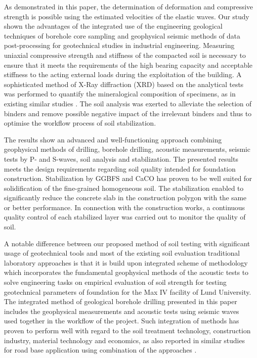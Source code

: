 \documentclass[USenglish,twocolumn]{article}
\begin{document}
As demonstrated in this paper, the determination of deformation and compressive strength is possible using the estimated velocities of the elastic waves. Our study shown the advantages of the integrated use of the engineering geological techniques of borehole core sampling and geophysical seismic methods of data post-processing for geotechnical studies in industrial engineering. Measuring uniaxial compressive strength and stiffness of the compacted soil is necessary to ensure that it meets the requirements of the high bearing capacity and acceptable stiffness to the acting external loads during the exploitation of the building. A sophisticated method of X-Ray diffraction (XRD) based on the analytical tests was performed to quantify the mineralogical composition of specimens, as in existing similar studies \cite{Pires,Naik}. The soil analysis was exerted to alleviate the selection of binders and remove possible negative impact of the irrelevant binders and thus to optimise the workflow process of soil stabilization.

The results show an advanced and well-functioning approach combining geophysical methods of drilling, borehole drilling, acoustic measurements, seismic tests by P- and S-waves, soil analysis and stabilization. The presented results meets the design requirements regarding soil quality intended for foundation construction. Stabilization by GGBFS and CaCO has proven to be well suited for solidification of the fine-grained homogeneous soil. The stabilization enabled to significantly reduce the concrete slab in the construction polygon with the same or better performance. In connection with the construction works, a continuous quality control of each stabilized layer was carried out to monitor the quality of soil. 

A notable difference between our proposed method of soil testing with significant usage of geotechnical tools and most of the existing soil evaluation traditional laboratory approaches \cite{Barwar,Sharma,Lindh202302} is that it is build upon integrated scheme of methodology which incorporates the fundamental geophysical methods of the acoustic tests to solve engineering tasks on empirical evaluation of soil strength for testing geotechnical parameters of foundation for the Max IV facility of Lund University. The integrated method of geological borehole drilling presented in this paper includes the geophysical measurements and acoustic tests using seismic waves used together in the workflow of the project. Such integration of methods has proven to perform well with regard to the soil treatment technology, construction industry, material technology and economics, as also reported in similar studies for road base application using combination of the approaches \cite{Gupta,Lindh202234,Eberemu,Lindh202303}. 
\end{document}
